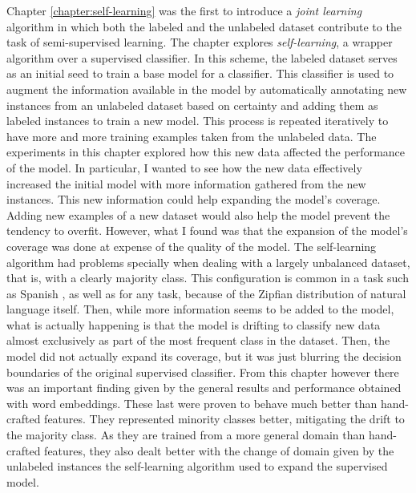 Chapter \ref{chapter:self-learning} was the first to introduce a {\em joint
learning} algorithm in which both the labeled and the unlabeled dataset
contribute to the task of semi-supervised learning. The chapter explores {\em
self-learning}, a wrapper algorithm over a supervised classifier. In this
scheme, the labeled dataset serves as an initial seed to train a base model for
a classifier. This classifier is used to augment the information available in
the model by automatically annotating new instances from an unlabeled dataset
based on certainty and adding them as labeled instances to train a new model.
This process is repeated iteratively to have more and more training examples
taken from the unlabeled data. The experiments in this chapter explored how
this new data affected the performance of the model. In particular, I wanted
to see how the new data effectively increased the initial model with more
information gathered from the new instances. This new information could help
expanding the model's coverage. Adding new examples of a new dataset would also
help the model prevent the tendency to overfit. However, what I found was that
the expansion of the model's coverage was done at expense of the quality of the
model. The self-learning algorithm had problems specially when dealing with a
largely unbalanced dataset, that is, with a clearly majority class. This
configuration is common in a task such as Spanish \vsd, as well as for any \nlp
task, because of the Zipfian distribution of natural language itself. Then,
while more information seems to be added to the model, what is actually
happening is that the model is drifting to classify new data almost exclusively
as part of the most frequent class in the dataset. Then, the model did not
actually expand its coverage, but it was just blurring the decision boundaries
of the original supervised classifier. From this chapter however there was an
important finding given by the general results and performance obtained with
word embeddings. These last were proven to behave much better than hand-crafted
features. They represented minority classes better, mitigating the drift to the
majority class. As they are trained from a more general domain than
hand-crafted features, they also dealt better with the change of domain given 
by the unlabeled instances the self-learning algorithm used to expand the 
supervised model.

